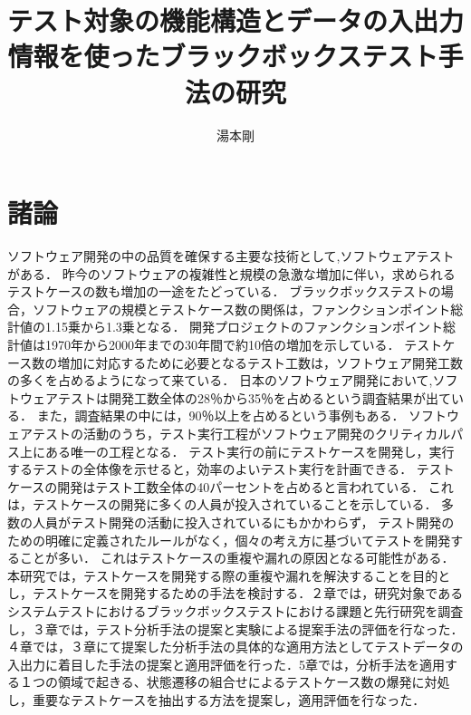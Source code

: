 \documentclass[a4paper,10pt]{jreport}
\title{テスト対象の機能構造とデータの入出力情報を使ったブラックボックステスト手法の研究}
\author{湯本剛}
\begin{document}
\maketitle
\thispagestyle{empty}

\newpage


\par
\vspace{0pt plus 1fil}
\newpage

\tableofcontents
\listoffigures
\listoftables

\pagebreak \setcounter{page}{1}

\section{諸論} %
ソフトウェア開発の中の品質を確保する主要な技術として,ソフトウェアテストがある．
昨今のソフトウェアの複雑性と規模の急激な増加に伴い，求められるテストケースの数も増加の一途をたどっている．
ブラックボックステストの場合，ソフトウェアの規模とテストケース数の関係は，ファンクションポイント総計値の1.15乗から1.3乗となる\cite{jones1998estimating}．
開発プロジェクトのファンクションポイント総計値は1970年から2000年までの30年間で約10倍の増加を示している\cite{longstreet2000}．
テストケース数の増加に対応するために必要となるテスト工数は，ソフトウェア開発工数の多くを占めるようになって来ている．
日本のソフトウェア開発において,ソフトウェアテストは開発工数全体の28％から35％を占めるという調査結果が出ている．
また，調査結果の中には，90％以上を占めるという事例もある\cite{IPA2015}．
ソフトウェアテストの活動のうち，テスト実行工程がソフトウェア開発のクリティカルパス上にある唯一の工程となる．
テスト実行の前にテストケースを開発し，実行するテストの全体像を示せると，効率のよいテスト実行を計画できる．
テストケースの開発はテスト工数全体の40パーセントを占めると言われている\cite{van2013tpi}．
これは，テストケースの開発に多くの人員が投入されていることを示している．
多数の人員がテスト開発の活動に投入されているにもかかわらず， テスト開発のための明確に定義されたルールがなく，個々の考え方に基づいてテストを開発することが多い．
これはテストケースの重複や漏れの原因となる可能性がある．
本研究では，テストケースを開発する際の重複や漏れを解決することを目的とし，テストケースを開発するための手法を検討する．２章では，研究対象であるシステムテストにおけるブラックボックステストにおける課題と先行研究を調査し，３章では，テスト分析手法の提案と実験による提案手法の評価を行なった．４章では，３章にて提案した分析手法の具体的な適用方法としてテストデータの入出力に着目した手法の提案と適用評価を行った．5章では，分析手法を適用する１つの領域で起きる、状態遷移の組合せによるテストケース数の爆発に対処し，重要なテストケースを抽出する方法を提案し，適用評価を行なった．
\end{document}
